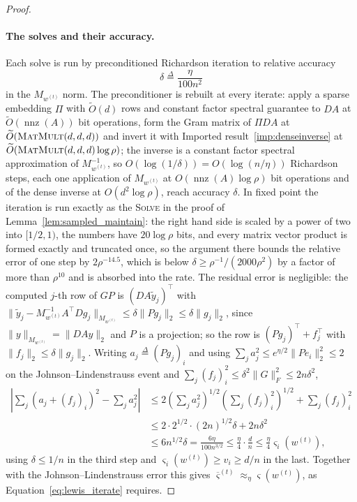 \documentclass[11pt]{article}
\newcommand{\nnz}{\operatorname{nnz}}
\newcommand{\MM}{\textsc{MatMult}}
\renewcommand{\O}{\widetilde O}
\newcommand{\defeq}{\stackrel{\Delta}{=}}
\begin{document}
\begin{proof}
\paragraph{The solves and their accuracy.}
Each solve is run by preconditioned Richardson iteration to relative accuracy
\[
\delta
\defeq
\frac{\eta}{100 n^{2}}
\]
in the $M_{w^{(t)}}$ norm.
The preconditioner is rebuilt at every iterate: apply a sparse embedding $\Pi$
with $\O(d)$ rows and constant factor spectral guarantee to
$D A$ at
$\O(\nnz(A))$ bit operations, form the Gram matrix of
$\Pi D A$ at
$\O(\MM(d, d, d))$ and invert it with Imported result~\ref{imp:denseinverse} at
$\O(\MM(d, d, d) \log \rho)$; the inverse is a constant factor spectral
approximation of $M_{w^{(t)}}^{-1}$, so
$O(\log(1 / \delta)) = O(\log(n / \eta))$ Richardson steps, each one application
of $M_{w^{(t)}}$ at
$O(\nnz(A) \log \rho)$ bit operations and of the dense inverse at
$O(d^{2} \log \rho)$, reach accuracy
$\delta$.
In fixed point the iteration is run exactly as the \textsc{Solve} in the proof
of Lemma~\ref{lem:sampled_maintain}: the right hand side is scaled by a power of
two into $[1/2, 1)$, the numbers have
$20 \log \rho$ bits, and every matrix vector product is formed exactly and
truncated once, so the argument there bounds the relative error of one step by
$2 \rho^{-14.5}$, which is below
$\delta \ge \rho^{-1} / (2000 \rho^{2})$ by a factor of more than
$\rho^{10}$ and is absorbed into the rate.
The residual error is negligible: the computed $j$-th row of
$G P$ is
$(D A \widetilde{y}_j)^{\top}$ with
$\|\widetilde{y}_j - M_{w^{(t)}}^{-1} A^\top D g_j\|_{M_{w^{(t)}}} \le \delta \|P g_j\|_2 \le \delta \|g_j\|_2$,
since $\|y\|_{M_{w^{(t)}}} = \|D A y\|_2$ and
$P$ is a projection; so the row is
$(P g_j)^{\top} + f_j^{\top}$ with
$\|f_j\|_2 \le \delta \|g_j\|_2$.
Writing $a_j \defeq (P g_j)_i$ and using
$\sum_j a_j^{2} \le e^{\eta / 2} \|P e_i\|_2^{2} \le 2$ on the
Johnson--Lindenstrauss event and
$\sum_j (f_j)_i^{2} \le \delta^{2} \|G\|_F^{2} \le 2 n \delta^{2}$,
\[
\begin{aligned}
\left| \sum_j \left( a_j + (f_j)_i \right)^{2} - \sum_j a_j^{2} \right|
&\le
2 \left( \sum_j a_j^{2} \right)^{1/2} \left( \sum_j (f_j)_i^{2} \right)^{1/2}
+ \sum_j (f_j)_i^{2} \\
&\le
2 \cdot 2^{1/2} \cdot (2 n)^{1/2} \delta + 2 n \delta^{2} \\
&\le
6 n^{1/2} \delta
=
\frac{6 \eta}{100 n^{3/2}}
\le
\frac{\eta}{4} \cdot \frac{d}{n}
\le
\frac{\eta}{4} \varsigma_i\left( w^{(t)} \right) ,
\end{aligned}
\]
using $\delta \le 1 / n$ in the third step and
$\varsigma_i(w^{(t)}) \ge v_i \ge d / n$ in the last.
Together with the Johnson--Lindenstrauss error this gives
$\overline{\varsigma}^{(t)} \approx_{\eta} \varsigma(w^{(t)})$, as
Equation~\eqref{eq:lewis_iterate} requires.


\end{proof}
\end{document}
